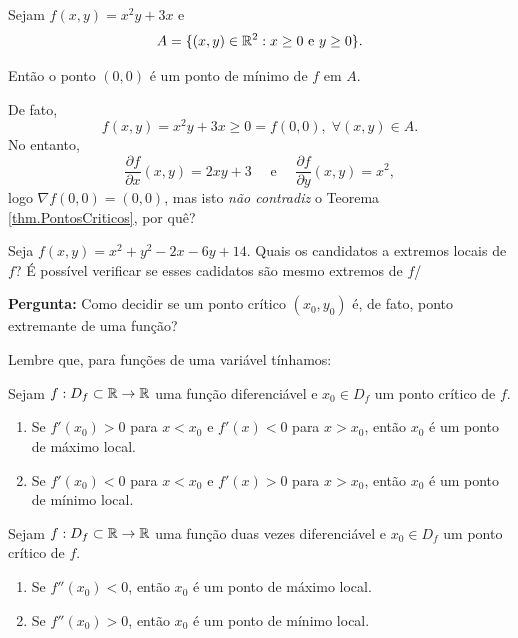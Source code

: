 \begin{example}
    Sejam \(f(x,y) = x^2 y + 3x\) e \[ A = \{(x,y)\in\mathbb{R}^2 : x\geq 0 \text{ e } y\geq 0\}.\]

    Então o ponto \((0,0)\) é um ponto de mínimo de \(f\) em \(A\).

    De fato, \[f(x,y) = x^2 y + 3x \geq 0 = f(0,0),\; \forall (x,y)\in A.\] No entanto, \[\frac{\partial f}{\partial x}(x,y) = 2xy + 3\quad \text{ e }\quad \frac{\partial f}{\partial y}(x,y) = x^2, \] logo \(\nabla f(0,0) = (0,0)\), mas isto \textit{não contradiz} o Teorema \ref{thm.PontosCriticos}, por quê?
\end{example}

\begin{exercise}
    Seja \(f(x,y) = x^2 + y^2 - 2x - 6y + 14\). Quais os candidatos a extremos locais de \(f\)? É possível verificar se esses cadidatos  são mesmo extremos de \(f\)/
\end{exercise}

\textbf{Pergunta: } Como decidir se um ponto crítico \((x_0,y_0)\) é, de fato, ponto extremante de uma função?

Lembre que, para funções de uma variável tínhamos:
\begin{theorem}
    Sejam \(f: D_f \subset \mathbb{R} \to \mathbb{R}\) uma função diferenciável e \(x_0\in D_f\) um ponto crítico de \(f\).
        \begin{enumerate}
            \item Se \(f'(x_0) > 0\) para \(x < x_0\) e \(f'(x) < 0\) para \(x > x_0\), então \(x_0\) é um ponto de máximo local.
            \item Se \(f'(x_0) < 0\) para \(x < x_0\) e \(f'(x) > 0\) para \(x > x_0\), então \(x_0\) é um ponto de mínimo local.
        \end{enumerate}
\end{theorem}

\begin{theorem}
    Sejam \(f: D_f \subset \mathbb{R} \to \mathbb{R}\) uma função duas vezes diferenciável e \(x_0\in D_f\) um ponto crítico de \(f\).
        \begin{enumerate}
            \item Se \(f''(x_0) < 0\), então \(x_0\) é um ponto de máximo local.
            \item Se \(f''(x_0) > 0\), então \(x_0\) é um ponto de mínimo local.
        \end{enumerate}
\end{theorem}

